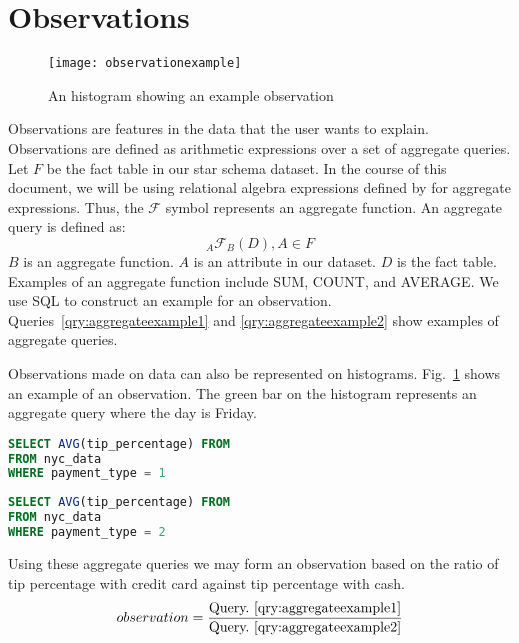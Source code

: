 \section{Observations}
\begin{figure}[ht]
  \begin{center}
  \texttt{[image: observationexample]}
  \end{center}

  \caption{An histogram showing an example observation}
  \label{fig:observation_example}
\end{figure}
Observations are features in the data that the user wants to explain. Observations are defined as arithmetic expressions over a set of aggregate queries. Let $F$ be the fact table in our star schema dataset. In the course of this document, we will be using relational algebra expressions defined by \cite{elmasri2011fundamentals} for aggregate expressions. Thus, the $\mathscr{F}$ symbol represents an aggregate function. An aggregate query is defined as:
$$_A\mathscr{F}_B(D), A \in F$$
$B$ is an aggregate function. $A$ is an attribute in our dataset. $D$ is the fact table. Examples of an aggregate function include SUM, COUNT, and AVERAGE.
We use SQL to construct an example for an observation. Queries~\ref{qry:aggregateexample1} and \ref{qry:aggregateexample2} show examples of aggregate queries.

Observations made on data can also be represented on histograms. Fig.~\ref{fig:observation_example} shows an example of an observation. The green bar on the histogram represents an aggregate query where the day is Friday.

\renewcommand{\lstlistingname}{Query}%
\begin{lstlisting}[language=SQL, caption=Aggregate Query for average tip percentage with credit cards, label=qry:aggregateexample1]
SELECT AVG(tip_percentage) FROM
FROM nyc_data
WHERE payment_type = 1
\end{lstlisting}
\newpage
\renewcommand{\lstlistingname}{Query}%
\begin{lstlisting}[language=SQL, caption=Aggregate Query for average tip percentage with cash, label=qry:aggregateexample2]
SELECT AVG(tip_percentage) FROM
FROM nyc_data
WHERE payment_type = 2
\end{lstlisting}

Using these aggregate queries we may form an observation based on the ratio of tip percentage with credit card against tip percentage with cash.
$$observation = \frac{\textnormal{Query.~\ref{qry:aggregateexample1}}}{\textnormal{Query.~\ref{qry:aggregateexample2}}}$$


